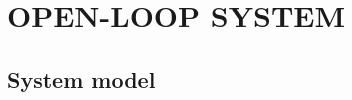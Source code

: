 \section{OPEN-LOOP SYSTEM} \label{sec:model}

\subsection{System model}

\begin{figure}[!htbp]
    \centering
    \DIFdelbeginFL %





\end{figure}
